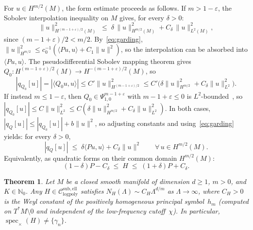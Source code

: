\documentclass[12pt]{amsart}
\newcommand{\Csub}{\mathcal{C}_{\mathrm{logpoly}}^{\mathrm{sub,ell}}}
\newtheorem{mainthmprime}{Theorem}
\begin{document}
For $u\in H^{m/2}(M)$, the form estimate proceeds as follows.
If $m>1-\varepsilon$, the Sobolev interpolation inequality on $M$
gives, for every $\delta>0$:
\[
  \|u\|_{H^{(m-1+\varepsilon)/2}(M)}^2
  \;\le\;
  \delta\,\|u\|_{H^{m/2}(M)}^2+C_\delta\,\|u\|_{L^2(M)}^2,
\]
since $(m-1+\varepsilon)/2<m/2$.  By~\eqref{eq:garding},
$\|u\|^2_{H^{m/2}}\le c_0^{-1}(\langle Pu,u\rangle+C_1\|u\|^2)$,
so the interpolation can be absorbed into $\langle Pu,u\rangle$.
The pseudodifferential Sobolev
mapping theorem gives
$Q_0\colon H^{(m-1+\varepsilon)/2}(M)\to\allowbreak H^{-(m-1+\varepsilon)/2}(M)$,
so
\[
  |q_{Q_0}[u]|=|\langle Q_0 u,u\rangle|
  \le C'\|u\|_{H^{(m-1+\varepsilon)/2}}^2
  \le C'\bigl(\delta\|u\|_{H^{m/2}}^2+C_\delta\|u\|_{L^2}^2\bigr).
\]
If instead $m\le 1-\varepsilon$, then $Q_0\in\Psi^{m-1+\varepsilon}_{1,0}$
with $m-1+\varepsilon\le 0$ is $L^2$-bounded~\cite{CalderonVaillancourt1972},
so $|q_{Q_0}[u]|\le C\|u\|_{L^2}^2\le
C(\delta\|u\|_{H^{m/2}}^2+C_\delta\|u\|_{L^2}^2)$.
In both cases, $|q_Q[u]|\le|q_{Q_0}[u]|+b\|u\|^2$, so adjusting constants
and using~\eqref{eq:garding} yields:
for every $\delta>0$,
\begin{equation}
  \label{eq:formbdd}
  |q_Q[u]|
  \;\le\;
  \delta\langle Pu,u\rangle+C_\delta\|u\|^2
  \qquad\forall\,u\in H^{m/2}(M).
\end{equation}
Equivalently, as quadratic forms on their common domain $H^{m/2}(M)$:
\[
  (1-\delta)P-C_\delta\;\le\; H\;\le\;(1+\delta)P+C_\delta.
\]

\begin{mainthmprime}
\label{thm:Dprime}
Let $M$ be a closed smooth manifold of dimension $d\ge 1$, $m>0$, and $K\in\mathbb{N}_0$.
Any $H\in\Csub$ satisfies
$N_H(\Lambda)\sim C_H\Lambda^{d/m}$ as $\Lambda\to\infty$,
where $C_H>0$ is the Weyl constant of the positively homogeneous principal
symbol~$h_m$ (computed on $T^*M\setminus 0$ and independent of the
low-frequency cutoff~$\chi$).
In particular, $\operatorname{spec}_{\times}(H)\ne\{\gamma_n\}$.
\end{mainthmprime}
\end{document}
